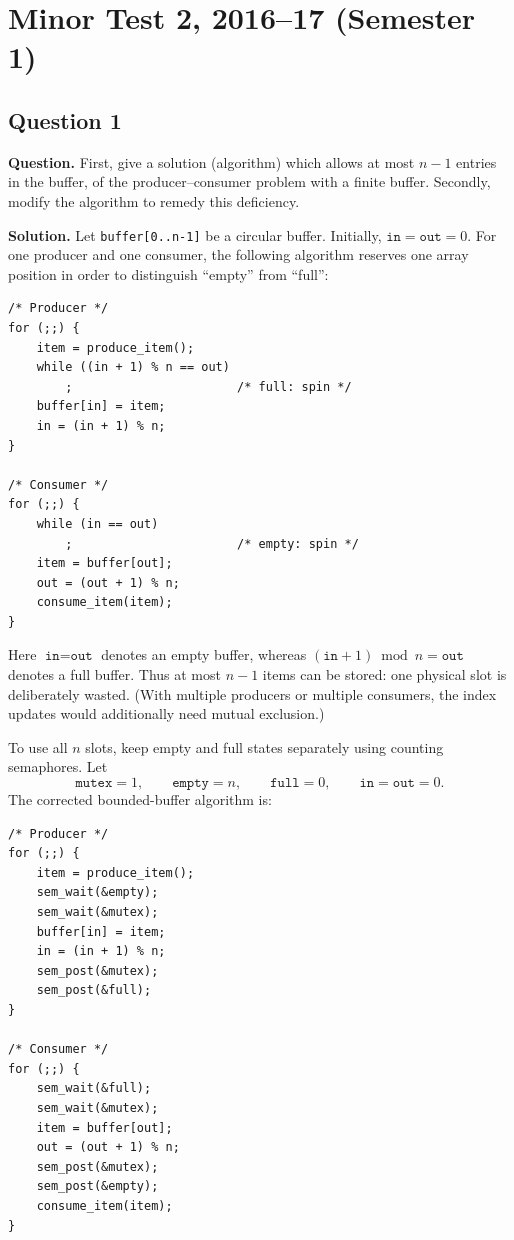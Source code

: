\section{Minor Test 2, 2016--17 (Semester 1)}

\subsection*{Question 1}
\textbf{Question.}
First, give a solution (algorithm) which allows at most \(n-1\) entries in
the buffer, of the producer--consumer problem with a finite buffer.
Secondly, modify the algorithm to remedy this deficiency.

\textbf{Solution.}
Let \texttt{buffer[0..n-1]} be a circular buffer.  Initially,
\(\texttt{in}=\texttt{out}=0\).  For one producer and one consumer, the
following algorithm reserves one array position in order to distinguish
``empty'' from ``full'':

\begin{verbatim}
/* Producer */
for (;;) {
    item = produce_item();
    while ((in + 1) % n == out)
        ;                       /* full: spin */
    buffer[in] = item;
    in = (in + 1) % n;
}

/* Consumer */
for (;;) {
    while (in == out)
        ;                       /* empty: spin */
    item = buffer[out];
    out = (out + 1) % n;
    consume_item(item);
}
\end{verbatim}

Here \(\texttt{in}=\texttt{out}\) denotes an empty buffer, whereas
\((\texttt{in}+1)\bmod n=\texttt{out}\) denotes a full buffer.  Thus at
most \(n-1\) items can be stored: one physical slot is deliberately
wasted.  (With multiple producers or multiple consumers, the index
updates would additionally need mutual exclusion.)

To use all \(n\) slots, keep empty and full states separately using
counting semaphores.  Let
\[
  \texttt{mutex}=1,\qquad \texttt{empty}=n,\qquad \texttt{full}=0,
  \qquad \texttt{in}=\texttt{out}=0.
\]
The corrected bounded-buffer algorithm is:

\begin{verbatim}
/* Producer */
for (;;) {
    item = produce_item();
    sem_wait(&empty);
    sem_wait(&mutex);
    buffer[in] = item;
    in = (in + 1) % n;
    sem_post(&mutex);
    sem_post(&full);
}

/* Consumer */
for (;;) {
    sem_wait(&full);
    sem_wait(&mutex);
    item = buffer[out];
    out = (out + 1) % n;
    sem_post(&mutex);
    sem_post(&empty);
    consume_item(item);
}
\end{verbatim}

